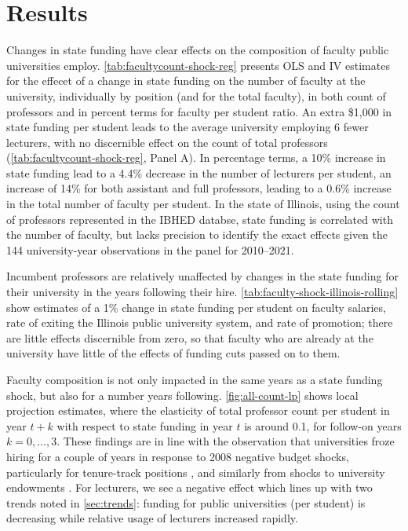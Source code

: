 \section{Results}
\label{sec:results}

Changes in state funding have clear effects on the composition of faculty public universities employ.
\autoref{tab:facultycount-shock-reg} presents OLS and IV estimates for the effecet of a change in state funding on the number of faculty at the university, individually by position (and for the total faculty), in both count of professors and in percent terms for faculty per student ratio.
An extra \$1,000 in state funding per student leads to the average university employing 6 fewer lecturers, with no discernible effect on the count of total professors (\autoref{tab:facultycount-shock-reg}, Panel A).
In percentage terms, a 10\% increase in state funding lead to a 4.4\% decrease in the number of lecturers per student, an increase of 14\% for both assistant and full professors, leading to a 0.6\% increase in the total number of faculty per student.
In the state of Illinois, using the count of professors represented in the IBHED databse, state funding is correlated with the number of faculty, but lacks precision to identify the exact effects given the 144 university-year observations in the panel for 2010--2021.

Incumbent professors are relatively unaffected by changes in the state funding for their university in the years following their hire.
\autoref{tab:faculty-shock-illinois-rolling} show estimates of a 1\% change in state funding per student on faculty salaries, rate of exiting the Illinois public university system, and rate of promotion; there are little effects discernible from zero, so that faculty who are already at the university have little of the effects of funding cuts passed on to them.

Faculty composition is not only impacted in the same years as a state funding shock, but also for a number years following.
\autoref{fig:all-count-lp} shows local projection estimates, where the elasticity of total professor count per student in year $t+k$ with respect to state funding in year $t$ is around 0.1, for follow-on years $k = 0, \hdots, 3$.
These findings are in line with the observation that universities froze hiring for a couple of years in response to 2008 negative budget shocks, particularly for tenure-track positions \citep{turner2014impact}, and similarly from shocks to university endowments \citep{brown2014endowment}.
For lecturers, we see a negative effect which lines up with two trends noted in \autoref{sec:trends}: funding for public universities (per student) is decreasing while relative usage of  lecturers increased rapidly.

